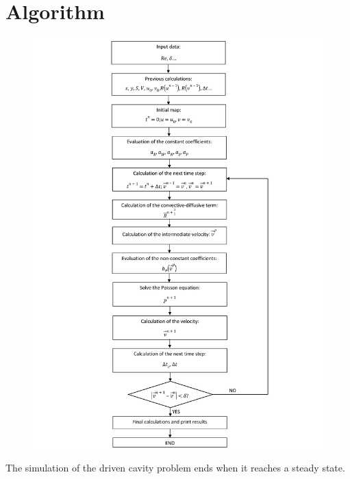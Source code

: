 \section{Algorithm}
\begin{figure}[H]
	\centering
	\includegraphics[scale=0.169]{DrivenCavity/algorithm}
\end{figure}
The simulation of the driven cavity problem ends when it reaches a steady state.

